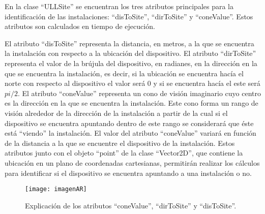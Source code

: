 En la clase ``ULLSite'' se encuentran los tres atributos principales para la identificación de las instalaciones: ``disToSite'', ``dirToSite'' y ``coneValue''. Estos atributos son calculados en tiempo de ejecución.

\bigskip
\bigskip
\bigskip









El atributo ``disToSite'' representa la distancia, en metros, a la que se encuentra la instalación con respecto a la ubicación del dispositivo. El atributo ``dirToSite'' representa el valor de la brújula del dispositivo, en radianes, en la dirección en la que se encuentra la instalación, es decir, si la ubicación se encuentra hacía el norte con respecto al dispositivo el valor será 0 y si se encuentra hacía el este será $pi/2$.
El atributo ``coneValue'' representa un cono de visión imaginario cuyo centro es la dirección en la que se encuentra la instalación. 
Este cono forma un rango de visión alrededor de la dirección de la instalación a partir de la cual si el dispositivo se encuentra apuntando dentro de este rango se considerará que éste está ``viendo'' la instalación. 
El valor del atributo ``coneValue'' variará en función de la distancia a la que se encuentre el dispositivo de la instalación.  
Estos atributos junto con el objeto ``point'' de la clase ``Vector2D'', que contiene la ubicación en un plano de coordenadas cartesianas, permitirán realizar los cálculos para identificar si el dispositivo se encuentra apuntando a una instalación o no.


\begin{figure}[h] 
    \centering
    \texttt{[image: imagenAR]}
    \caption{Explicación de los atributos ``coneValue'', ``dirToSite'' y ``disToSite''.}
    \label{fig:dirSite}
\end{figure}
  
